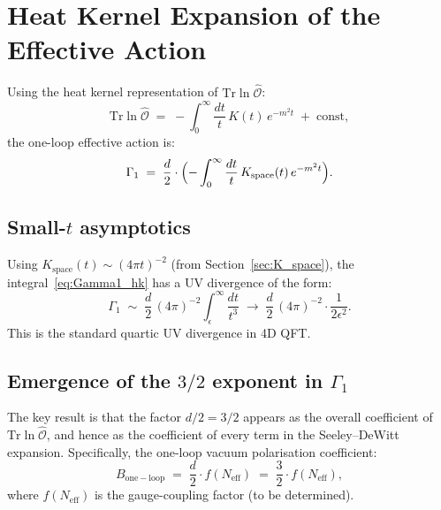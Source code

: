 \documentclass[11pt,a4paper]{article}
\theoremstyle{definition}
\theoremstyle{remark}
\begin{document}
\section{Heat Kernel Expansion of the Effective Action}
\label{sec:K_effective}

Using the heat kernel representation of $\mathrm{Tr}\ln\hat{\mathcal{O}}$:
\begin{equation}
  \mathrm{Tr}\ln\hat{\mathcal{O}}
  \;=\; -\int_0^\infty \frac{dt}{t}\,K(t)\,e^{-m^2 t}
  \;+\; \text{const},
  \label{eq:Trln}
\end{equation}
the one-loop effective action is:
\begin{equation}
  \Gamma_1
  \;=\; \frac{d}{2} \cdot \Bigl(-\int_0^\infty \frac{dt}{t}\,K_{\mathrm{space}}(t)\,e^{-m^2 t}\Bigr).
  \label{eq:Gamma1_hk}
\end{equation}

\subsection{Small-$t$ asymptotics}

Using $K_{\mathrm{space}}(t) \sim (4\pi t)^{-2}$ (from Section~\ref{sec:K_space}),
the integral~\eqref{eq:Gamma1_hk} has a UV divergence of the form:
\begin{equation}
  \Gamma_1 \;\sim\; \frac{d}{2}\,(4\pi)^{-2}\int_{\epsilon}^\infty \frac{dt}{t^3}
  \;\longrightarrow\; \frac{d}{2}\,(4\pi)^{-2} \cdot \frac{1}{2\epsilon^2}.
  \label{eq:Gamma1_div}
\end{equation}
This is the standard quartic UV divergence in 4D QFT.

\subsection{Emergence of the $3/2$ exponent in $\Gamma_1$}

The key result is that the factor $d/2 = 3/2$ appears as the overall
coefficient of $\mathrm{Tr}\ln\hat{\mathcal{O}}$, and hence as the
coefficient of every term in the Seeley–DeWitt expansion.
Specifically, the one-loop vacuum polarisation coefficient:
\begin{equation}
  \boxed{
  B_{\mathrm{one-loop}}
  \;=\; \frac{d}{2} \cdot f(N_{\mathrm{eff}})
  \;=\; \frac{3}{2} \cdot f(N_{\mathrm{eff}}),
  }
  \label{eq:B_from_hk}
\end{equation}
where $f(N_{\mathrm{eff}})$ is the gauge-coupling factor (to be determined).
\end{document}
